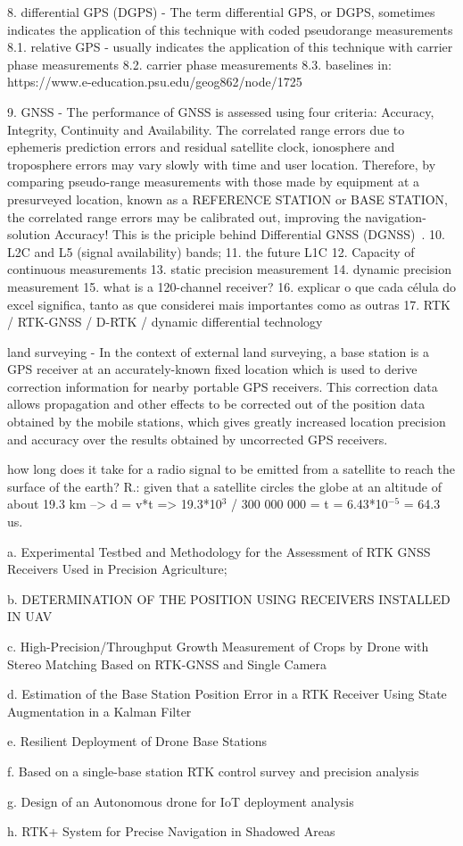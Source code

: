     8. differential GPS (DGPS) - The term differential GPS, or DGPS, sometimes indicates the application of this technique with coded pseudorange measurements
    8.1. relative GPS - usually indicates the application of this technique with carrier phase measurements
    8.2. carrier phase measurements
    8.3. baselines
    in: https://www.e-education.psu.edu/geog862/node/1725

    9. GNSS - The performance of GNSS is assessed using four criteria: Accuracy, Integrity, Continuity and Availability. The correlated range errors due to ephemeris prediction errors and residual satellite clock, ionosphere and troposphere errors may vary slowly with time and user location.
    Therefore, by comparing pseudo-range measurements with those made by equipment at a presurveyed location, known as a REFERENCE STATION or BASE STATION, the correlated range errors may be calibrated out, improving the navigation-solution Accuracy! This is the priciple behind Differential GNSS (DGNSS)~\cite{edseee_9101092}. %
    10. L2C and L5 (signal availability) bands;
    11. the future L1C
    12. Capacity of continuous measurements
    13. static precision measurement
    14. dynamic precision measurement
    15. what is a 120-channel receiver?
    16. explicar o que cada célula do excel significa, tanto as que considerei mais importantes como as outras
    17. RTK / RTK-GNSS / D-RTK / dynamic differential technology~\cite{ayers_geosystems_2011}
       
    land surveying - In the context of external land surveying, a base station is a GPS receiver at an accurately-known fixed location which is used to derive correction information for nearby portable GPS receivers. This correction data allows propagation and other effects to be corrected out of the position data obtained by the mobile stations, which gives greatly increased location precision and accuracy over the results obtained by uncorrected GPS receivers.

    how long does it take for a radio signal to be emitted from a satellite to reach the surface of the earth? 
    R.: given that a satellite circles the globe at an altitude of about 19.3 km --> d = v*t => 19.3*10$^3$ / 300 000 000 = t = 6.43*10$^{-5}$ = 64.3 us.

a. Experimental Testbed and Methodology for the
Assessment of RTK GNSS Receivers Used
in Precision Agriculture;

b. DETERMINATION OF THE POSITION USING
RECEIVERS INSTALLED IN UAV

c. High-Precision/Throughput Growth Measurement of
Crops by Drone with Stereo Matching Based on
RTK-GNSS and Single Camera

d. Estimation of the Base Station Position Error in a
RTK Receiver Using State Augmentation in a
Kalman Filter

e. Resilient Deployment of Drone Base Stations

f. Based on a single-base station RTK control survey
and precision analysis 

g. Design of an Autonomous drone for IoT deployment
analysis 

h. RTK+ System for Precise Navigation in Shadowed
Areas 
